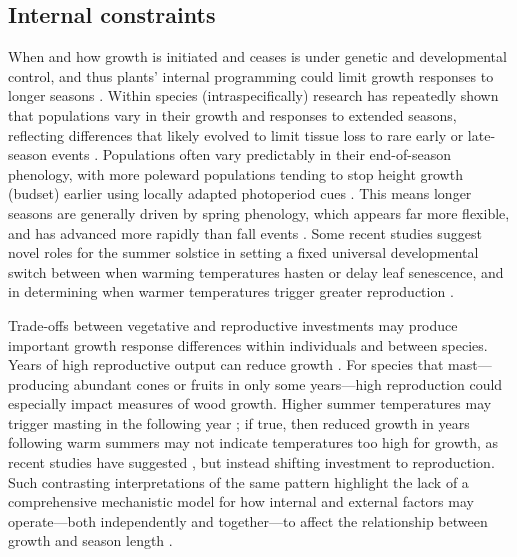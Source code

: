 \documentclass[11pt]{article}
\newcommand{\R}[1]{\label{#1}\linelabel{#1}}
\begin{document}
\subsection*{Internal constraints}
When and how growth is initiated and ceases is under genetic and developmental control, and thus plants' internal programming could limit growth responses to longer seasons \citep{howe2003genotype}. Within species (intraspecifically) research has repeatedly shown that populations vary in their growth and responses to extended seasons, reflecting differences that likely evolved to limit tissue loss to rare early or late-season events \citep{mitton2012mountain,lange2006thresholds,cleland2024effects}. Populations often vary predictably in their end-of-season phenology, with more poleward populations tending to stop height growth (budset) earlier using locally adapted photoperiod cues \citep{soolanayakanahally2013timing,aitken2016}. This means longer seasons are generally driven by spring phenology, which appears far more flexible, and has advanced more rapidly than fall events \citep{aitken2016}. Some recent studies suggest novel roles for the summer solstice \citep{zohner2023effect} in setting a fixed universal developmental switch between when warming temperatures hasten or delay leaf senescence, and in determining when warmer temperatures trigger greater reproduction \citep{Journe2024}. %

Trade-offs between vegetative and reproductive investments may produce important growth response differences within individuals and  between species. Years of high reproductive output can reduce growth \citep{thomas2011bookchptr,hacket2016tree}. For species that mast---producing abundant cones or fruits in only some years---high reproduction could especially impact measures of wood growth. Higher summer temperatures may trigger masting in the following year \citep{hacket2016tree,hacket2016consistent}; if true, then reduced growth in years following warm summers may not indicate temperatures too high for growth, as recent studies have suggested \citep[e.g.][]{gantois2022new,dow2022warm}, but instead shifting investment to reproduction. Such contrasting interpretations of the same pattern highlight the lack of a comprehensive mechanistic model for how internal and external factors may operate---both independently and together---to affect the relationship between growth and season length \citep[see Box,][]{korner2015paradigm}\R{forbigKnomodel1}.
\end{document}
